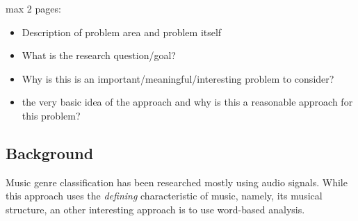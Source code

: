 max 2 pages:
\begin{itemize}
\item Description of problem area and problem itself
\item What is the research question/goal?
\item Why is this is an important/meaningful/interesting problem to consider?
\item the very basic idea of the approach and why is this a reasonable approach for this problem?
\end{itemize}

	\subsection{Background}
Music genre classification has been researched mostly using audio signals. While this approach uses the \textit{defining} characteristic of music, namely, its musical structure, an other interesting approach is to use word-based analysis.